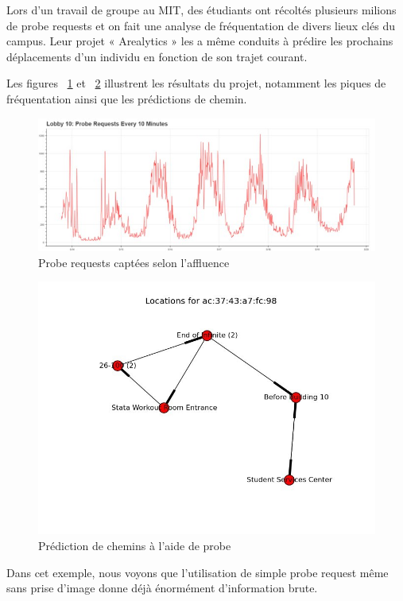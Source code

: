 Lors d’un travail de groupe au MIT, des étudiants ont récoltés plusieurs milions de probe requests et on fait une
analyse de fréquentation de divers lieux clés du campus. Leur projet « Arealytics » les a même conduits à prédire
les prochains déplacements d’un individu en fonction de son trajet courant.

Les figures ~\ref{fig:arealytics-graph} et ~\ref{fig:arealytics-path} illustrent les résultats du projet, notamment les piques de fréquentation
ainsi que les prédictions de chemin.
\begin{figure}[H]
	\centering
	\includegraphics[width=16cm]{images/etude-legi-1.jpg}
	\caption{Probe requests captées selon l'affluence}
	\label{fig:arealytics-graph}
\end{figure}
\begin{figure}[H]
	\centering
	\includegraphics[width=12cm]{images/etude-legi-2.jpg}
	\caption{Prédiction de chemins à l'aide de probe}
	\label{fig:arealytics-path}
\end{figure}

Dans cet exemple, nous voyons que l’utilisation de simple probe request même sans prise d’image donne déjà
énormément d’information brute.

